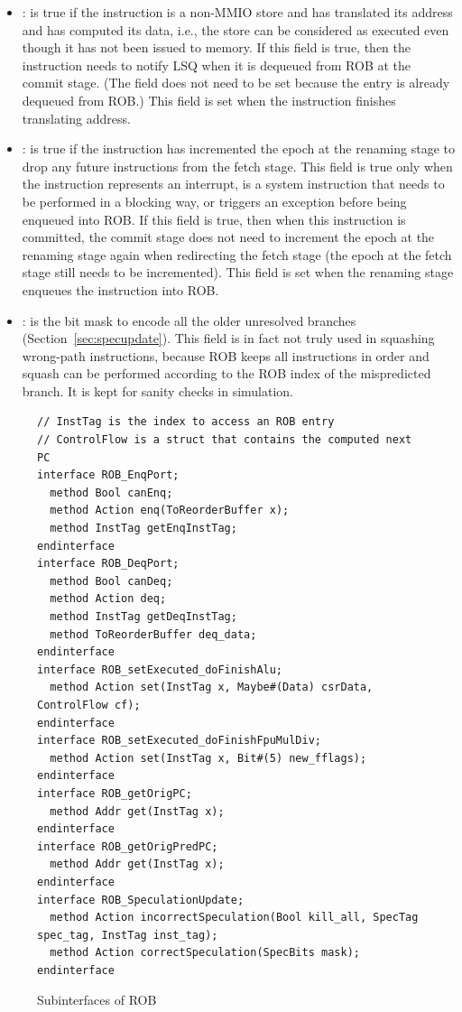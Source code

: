 \begin{itemize}
    \item {}: is true if the instruction is a non-MMIO store and has translated its address and has computed its data, i.e., the store can be considered as executed even though it has not been issued to memory.
    If this field is true, then the instruction needs to notify LSQ when it is dequeued from ROB at the commit stage.
    (The  field does not need to be set because the entry is already dequeued from ROB.)
    This field is set when the instruction finishes translating address.
    
    \item {}: is true if the instruction has incremented the epoch at the renaming stage to drop any future instructions from the fetch stage.
    This field is true only when the instruction represents an interrupt, is a system instruction that needs to be performed in a blocking way, or triggers an exception before being enqueued into ROB.
    If this field is true, then when this instruction is committed, the commit stage does not need to increment the epoch at the renaming stage again when redirecting the fetch stage (the epoch at the fetch stage still needs to be incremented).
    This field is set when the renaming stage enqueues the instruction into ROB.
    
    \item {}: is the bit mask to encode all the older unresolved branches (Section~\ref{sec:specupdate}).
    This field is in fact not truly used in squashing wrong-path instructions, because ROB keeps all instructions in order and squash can be performed according to the ROB index of the mispredicted branch.
    It is kept for sanity checks in simulation.
\end{itemize}

\begin{figure}[!htb]
\begin{lstlisting}[caption={}]
// InstTag is the index to access an ROB entry
// ControlFlow is a struct that contains the computed next PC
interface ROB_EnqPort;
  method Bool canEnq;
  method Action enq(ToReorderBuffer x);
  method InstTag getEnqInstTag;
endinterface
interface ROB_DeqPort;
  method Bool canDeq;
  method Action deq;
  method InstTag getDeqInstTag;
  method ToReorderBuffer deq_data;
endinterface
interface ROB_setExecuted_doFinishAlu;
  method Action set(InstTag x, Maybe#(Data) csrData, ControlFlow cf);
endinterface
interface ROB_setExecuted_doFinishFpuMulDiv;
  method Action set(InstTag x, Bit#(5) new_fflags);
endinterface
interface ROB_getOrigPC;
  method Addr get(InstTag x);
endinterface
interface ROB_getOrigPredPC;
  method Addr get(InstTag x);
endinterface
interface ROB_SpeculationUpdate;
  method Action incorrectSpeculation(Bool kill_all, SpecTag spec_tag, InstTag inst_tag);
  method Action correctSpeculation(SpecBits mask);
endinterface
\end{lstlisting}
\caption{Subinterfaces of ROB}\label{fig:rob-subifc}
\end{figure}

